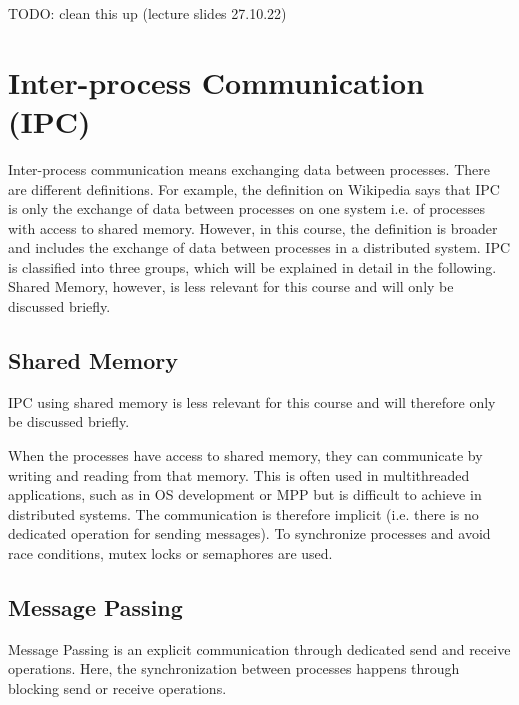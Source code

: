 TODO: clean this up (lecture slides 27.10.22)

\chapter{Inter-process Communication (IPC)}

Inter-process communication means exchanging data between processes. There are different definitions. For example, the definition on Wikipedia says that \ac{IPC} is only the exchange of data between processes on one system i.e. of processes with access to shared memory. However, in this course, the definition is broader and includes the exchange of data between processes in a distributed system. \ac{IPC} is classified into three groups, which will be explained in detail in the following. Shared Memory, however, is less relevant for this course and will only be discussed briefly.

\section{Shared Memory}

\ac{IPC} using shared memory is less relevant for this course and will therefore only be discussed briefly.

When the processes have access to shared memory, they can communicate by writing and reading from that memory. This is often used in multithreaded applications, such as in \ac{OS} development or \ac{MPP} but is difficult to achieve in distributed systems. The communication is therefore implicit (i.e. there is no dedicated operation for sending messages). To synchronize processes and avoid race conditions, mutex locks or semaphores are used.


\section{Message Passing}

Message Passing is an explicit communication through dedicated send and receive operations.
Here, the synchronization between processes happens through blocking send or receive operations.

